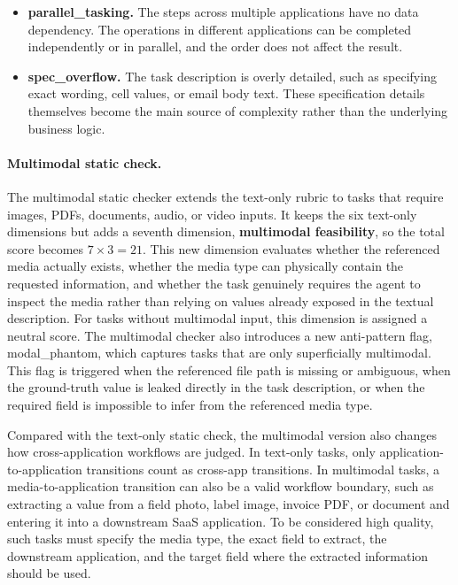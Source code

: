 \begin{tcolorbox}[
    title=Text-only Static Check Rubric,
    colback=gray!3,
    colframe=black!45,
    fonttitle=\bfseries,
    breakable
]
\begin{itemize}
    \item \textbf{{\ttfamily parallel\_tasking}.}
    The steps across multiple applications have no data dependency. The operations in different applications can be completed independently or in parallel, and the order does not affect the result.

    \item \textbf{{\ttfamily spec\_overflow}.}
    The task description is overly detailed, such as specifying exact wording, cell values, or email body text. These specification details themselves become the main source of complexity rather than the underlying business logic.
\end{itemize}
\end{tcolorbox}

\paragraph{Multimodal static check.}
The multimodal static checker extends the text-only rubric to tasks that require images, PDFs, documents, audio, or video inputs. It keeps the six text-only dimensions but adds a seventh dimension, \textbf{multimodal feasibility}, so the total score becomes $7 \times 3 = 21$. This new dimension evaluates whether the referenced media actually exists, whether the media type can physically contain the requested information, and whether the task genuinely requires the agent to inspect the media rather than relying on values already exposed in the textual description. For tasks without multimodal input, this dimension is assigned a neutral score. The multimodal checker also introduces a new anti-pattern flag, {\ttfamily modal\_phantom}, which captures tasks that are only superficially multimodal. This flag is triggered when the referenced file path is missing or ambiguous, when the ground-truth value is leaked directly in the task description, or when the required field is impossible to infer from the referenced media type.

Compared with the text-only static check, the multimodal version also changes how cross-application workflows are judged. In text-only tasks, only application-to-application transitions count as cross-app transitions. In multimodal tasks, a media-to-application transition can also be a valid workflow boundary, such as extracting a value from a field photo, label image, invoice PDF, or document and entering it into a downstream SaaS application. To be considered high quality, such tasks must specify the media type, the exact field to extract, the downstream application, and the target field where the extracted information should be used.

